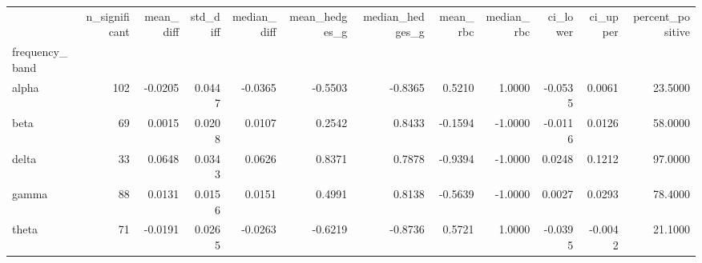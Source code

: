 \begin{tabular}{lrrrrrrrrrrr}
\toprule
 & n\_significant & mean\_diff & std\_diff & median\_diff & mean\_hedges\_g & median\_hedges\_g & mean\_rbc & median\_rbc & ci\_lower & ci\_upper & percent\_positive \\
frequency\_band &  &  &  &  &  &  &  &  &  &  &  \\
\midrule
alpha & 102 & -0.0205 & 0.0447 & -0.0365 & -0.5503 & -0.8365 & 0.5210 & 1.0000 & -0.0535 & 0.0061 & 23.5000 \\
beta & 69 & 0.0015 & 0.0208 & 0.0107 & 0.2542 & 0.8433 & -0.1594 & -1.0000 & -0.0116 & 0.0126 & 58.0000 \\
delta & 33 & 0.0648 & 0.0343 & 0.0626 & 0.8371 & 0.7878 & -0.9394 & -1.0000 & 0.0248 & 0.1212 & 97.0000 \\
gamma & 88 & 0.0131 & 0.0156 & 0.0151 & 0.4991 & 0.8138 & -0.5639 & -1.0000 & 0.0027 & 0.0293 & 78.4000 \\
theta & 71 & -0.0191 & 0.0265 & -0.0263 & -0.6219 & -0.8736 & 0.5721 & 1.0000 & -0.0395 & -0.0042 & 21.1000 \\
\bottomrule
\end{tabular}